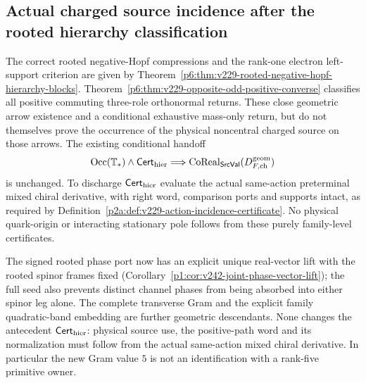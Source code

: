 \documentclass[12pt,a4paper]{article}
\begin{document}

\subsection{Actual charged source incidence after the rooted hierarchy classification}
\label{p5:sec:v229-charged-origin-scope}
\begin{corollary}
\label{p5:cor:v229-charged-action-origin-scope}
The correct rooted negative-Hopf compressions and the rank-one electron
left-support criterion are given by
Theorem~\ref{p6:thm:v229-rooted-negative-hopf-hierarchy-blocks}.
Theorem~\ref{p6:thm:v229-opposite-odd-positive-converse}
classifies all positive commuting three-role orthonormal returns.
These close geometric arrow existence and a conditional exhaustive
mass-only return, but do not themselves prove the occurrence of the
physical noncentral charged source on those arrows.  The existing
conditional handoff
\[
 \operatorname{Occ}(\mathbb T_*)\land\mathsf{Cert}_{\rm hier}
 \Longrightarrow
 \operatorname{CoReal}_{\mathsf{SrcVal}}(D_{F,{\rm ch}}^{\rm geom})
\]
is unchanged.  To discharge $\mathsf{Cert}_{\rm hier}$ evaluate the
actual same-action preterminal mixed chiral derivative, with right word,
comparison ports and supports intact, as required by
Definition~\ref{p2a:def:v229-action-incidence-certificate}.
No physical quark-origin or interacting stationary pole follows from
these purely family-level certificates.
\end{corollary}

\begin{remark}
\label{p5:rem:v242-signed-provider-origin}
The signed rooted phase port now has an explicit unique real-vector lift
with the rooted spinor frames fixed
(Corollary~\ref{p1:cor:v242-joint-phase-vector-lift}); the full seed
also prevents distinct channel phases from being absorbed into either
spinor leg alone. The complete transverse Gram and the explicit family
quadratic-band embedding are further geometric descendants. None changes
the antecedent \(\mathsf{Cert}_{\rm hier}\): physical source use,
the positive-path word and its normalization must follow from the actual
same-action mixed chiral derivative. In particular the new Gram value
\(5\) is not an identification with a rank-five primitive owner.
\end{remark}
\end{document}
